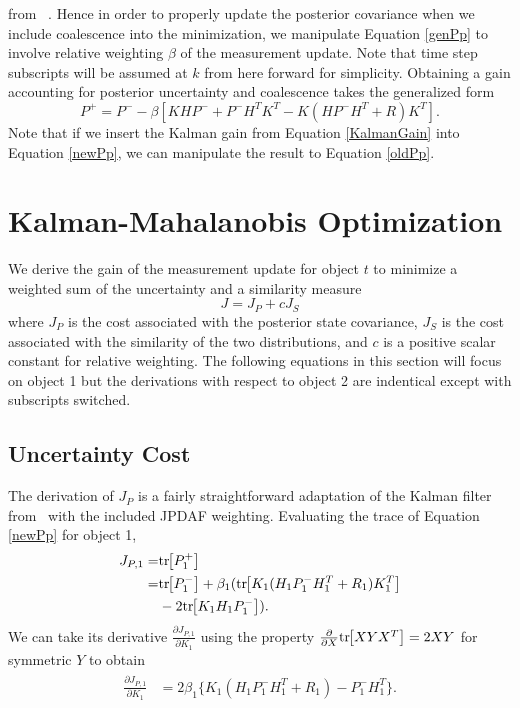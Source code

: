 \documentclass[letterpaper, 10pt, conference]{ieeeconf}
\newcommand{\bracket}[1]{\ensuremath{\left[ #1 \right]}}
\newcommand{\tr}[1]{\mathrm{tr}\ensuremath{\negthickspace\bracket{#1}}}
\begin{document}
from ~\cite{OptEst1}. Hence in order to properly update the posterior covariance when we include coalescence into the minimization, we manipulate Equation \ref{genPp} to involve relative weighting $\beta$ of the measurement update. Note that time step subscripts will be assumed at $k$ from here forward for simplicity. Obtaining a gain accounting for posterior uncertainty and coalescence takes the generalized form
\begin{equation}
\label{newPp}
P^+=P^--\beta[KHP^-+P^-H^TK^T-K(HP^-H^T+R)K^T].
\end{equation}
Note that if we insert the Kalman gain from Equation \ref{KalmanGain} into Equation \ref{newPp}, we can manipulate the result to Equation \ref{oldPp}.


\section{Kalman-Mahalanobis Optimization}
\label{KMM}
We derive the gain of the measurement update for object $t$ to minimize a weighted sum of the uncertainty and a similarity measure
\begin{equation} \label{CostDef}
J=J_P+cJ_S
\end{equation}
where $J_P$ is the cost associated with the posterior state covariance, $J_S$ is the cost associated with the similarity of the two distributions, and $c$ is a positive scalar constant for relative weighting. The following equations in this section will focus on object 1 but the derivations with respect to object 2 are indentical except with subscripts switched.

\subsection{Uncertainty Cost} The derivation of $J_P$ is a fairly straightforward adaptation of the Kalman filter from~\cite{OptEst1} with the included JPDAF weighting. Evaluating the trace of Equation \ref{newPp} for object 1,
\begin{align}
\begin{split}
J_{P,1}=&\tr{P_1^+} \\
=& \tr{P_1^-}+\beta_1(\tr{K_1(H_1P_1^-H_1^T+R_1)K_1^T}\\
&-2\tr{K_1H_1P_1^-}).
\end{split}
\end{align}
We can take its derivative $\frac{\partial J_{P,1}}{\partial K_{1}}$ using the property $\frac{\partial}{\partial X}\tr{XYX^T}=2XY$ for symmetric $Y$ to obtain
\begin{align}
\label{CostP}
\begin{split}
\frac{\partial J_{P,1}}{\partial K_{1}}&=2\beta_1\{{K_1(H_1P_1^-H_1^T+R_1)-P_1^-H_1^T}\}.
\end{split}
\end{align}
\end{document}
